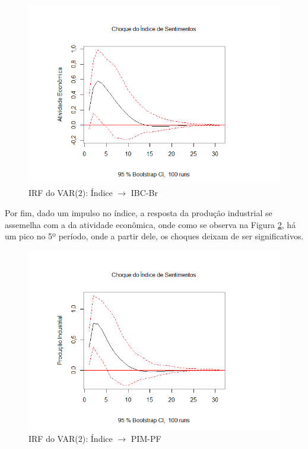 \begin{figure}[hbtp]
	\centering
	\caption{IRF do VAR($2$): Índice $\rightarrow$ IBC-Br} \label{figure:irf_indice_ibcbr_model_2}
	\includegraphics[scale = 0.60]{figuras/irf_indice_ibcbr_model_2.PNG}
\end{figure}

Por fim, dado um impulso no índice, a resposta da produção industrial se assemelha com a da atividade econômica, onde como se observa na Figura \ref{figure:irf_indice_pimpf_model_2}, há um pico no 5º período, onde a partir dele, os choques deixam de ser significativos.

\begin{figure}[hbtp]
	\centering
	\caption{IRF do VAR($2$): Índice $\rightarrow$ PIM-PF} \label{figure:irf_indice_pimpf_model_2}
	\includegraphics[scale = 0.60]{figuras/irf_indice_pimpf_model_2.PNG}
\end{figure}

